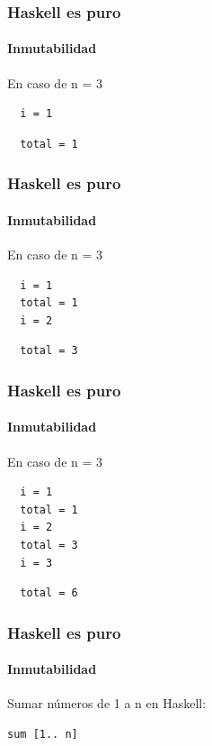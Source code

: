 \documentclass{beamer}
\begin{document}
\begin{frame}[fragile]
  \frametitle{Haskell es puro}
  \framesubtitle{Inmutabilidad}

En caso de n = 3

\begin{verbatim}
  i = 1
\end{verbatim} 
\vspace{-0.8cm}
\color{blue} 
\begin{verbatim}
  total = 1
\end{verbatim}

\end{frame}



\begin{frame}[fragile]
  \frametitle{Haskell es puro}
  \framesubtitle{Inmutabilidad}

En caso de n = 3

\begin{verbatim}
  i = 1
  total = 1
  i = 2
\end{verbatim}
\vspace{-0.8cm}
\color{blue} 
\begin{verbatim}
  total = 3
\end{verbatim}

\end{frame}



\begin{frame}[fragile]
  \frametitle{Haskell es puro}
  \framesubtitle{Inmutabilidad}

En caso de n = 3

\begin{verbatim}
  i = 1
  total = 1
  i = 2
  total = 3 
  i = 3
\end{verbatim}
\vspace{-0.8cm}
\color{blue} 
\begin{verbatim}
  total = 6
\end{verbatim}

\end{frame}


\begin{frame}[fragile]
  \frametitle{Haskell es puro}
  \framesubtitle{Inmutabilidad}

Sumar números de 1 a n en Haskell: 

\begin{lstlisting}
sum [1.. n]
\end{lstlisting}

\end{frame}
\end{document}
